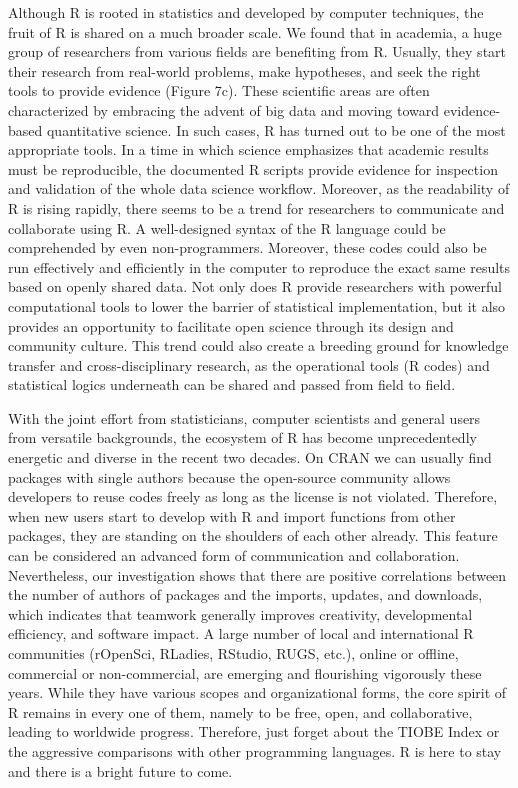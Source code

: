 Although R is rooted in statistics and developed by computer techniques,
the fruit of R is shared on a much broader scale. We found that in
academia, a huge group of researchers from various fields are benefiting
from R. Usually, they start their research from real-world problems,
make hypotheses, and seek the right tools to provide evidence (Figure
7c). These scientific areas are often characterized by embracing the
advent of big data and moving toward evidence-based quantitative
science. In such cases, R has turned out to be one of the most
appropriate tools. In a time in which science emphasizes that academic
results must be reproducible, the documented R scripts provide evidence
for inspection and validation of the whole data science workflow.
Moreover, as the readability of R is rising rapidly, there seems to be a
trend for researchers to communicate and collaborate using R. A
well-designed syntax of the R language could be comprehended by even
non-programmers. Moreover, these codes could also be run effectively and
efficiently in the computer to reproduce the exact same results based on
openly shared data. Not only does R provide researchers with powerful
computational tools to lower the barrier of statistical implementation,
but it also provides an opportunity to facilitate open science through
its design and community culture. This trend could also create a
breeding ground for knowledge transfer and cross-disciplinary research,
as the operational tools (R codes) and statistical logics underneath can
be shared and passed from field to field.

With the joint effort from statisticians, computer scientists and
general users from versatile backgrounds, the ecosystem of R has become
unprecedentedly energetic and diverse in the recent two decades. On CRAN
we can usually find packages with single authors because the open-source
community allows developers to reuse codes freely as long as the license
is not violated. Therefore, when new users start to develop with R and
import functions from other packages, they are standing on the shoulders
of each other already. This feature can be considered an advanced form
of communication and collaboration. Nevertheless, our investigation
shows that there are positive correlations between the number of authors
of packages and the imports, updates, and downloads, which indicates
that teamwork generally improves creativity, developmental efficiency,
and software impact. A large number of local and international R
communities (rOpenSci, RLadies, RStudio, RUGS, etc.), online or offline,
commercial or non-commercial, are emerging and flourishing vigorously
these years. While they have various scopes and organizational forms,
the core spirit of R remains in every one of them, namely to be free,
open, and collaborative, leading to worldwide progress. Therefore, just
forget about the TIOBE Index or the aggressive comparisons with other
programming languages. R is here to stay and there is a bright future to
come.

